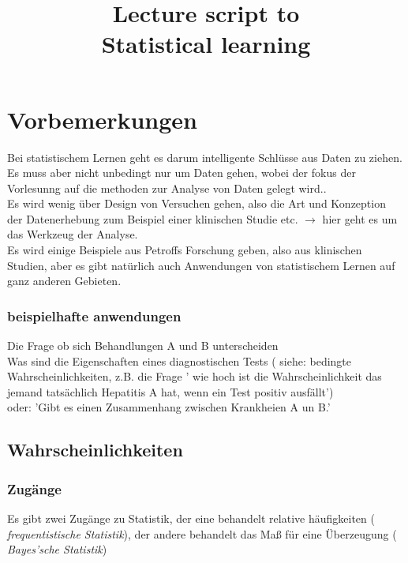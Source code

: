 \documentclass[a4paper]{article}
\title{Lecture script to \\Statistical learning}
\author{\MyDetails}
\theoremstyle{definition}
\theoremstyle{remark}
\begin{document}
\maketitle
\section{Vorbemerkungen}
\label{sub:vorbemerkungen}
Bei statistischem Lernen geht es darum intelligente Schlüsse aus Daten zu ziehen.\\
Es muss aber nicht unbedingt nur um Daten gehen, wobei der fokus der Vorlesunng auf die methoden zur Analyse von Daten gelegt wird..\\
Es wird wenig über Design von Versuchen gehen, also die Art und Konzeption der Datenerhebung zum Beispiel einer klinischen Studie etc. $\rightarrow $ hier geht es um das Werkzeug der Analyse.\\
Es wird einige Beispiele aus Petroffs Forschung geben, also aus klinischen Studien, aber es gibt natürlich auch Anwendungen von statistischem Lernen auf ganz anderen Gebieten.\\
\subsubsection{beispielhafte anwendungen}
\label{ssub:beispielhafte_anwendungen}
Die Frage ob sich Behandlungen A und B unterscheiden\\
Was sind die Eigenschaften eines diagnostischen Tests ( siehe: bedingte Wahrscheinlichkeiten, z.B. die Frage ' wie hoch ist die Wahrscheinlichkeit das jemand tatsächlich Hepatitis A hat, wenn ein Test positiv ausfällt')\\
oder: 'Gibt es einen Zusammenhang zwischen Krankheien A un B.'\\
\subsection{Wahrscheinlichkeiten}
\label{sub:wahrscheinlichkeiten}

\subsubsection{Zugänge}
\label{ssub:zugange}
Es gibt zwei Zugänge zu Statistik, der eine behandelt relative häufigkeiten ( \textit{frequentistische Statistik}), der andere behandelt das Maß für eine Überzeugung ( \textit{Bayes'sche Statistik})\\
\end{document}
